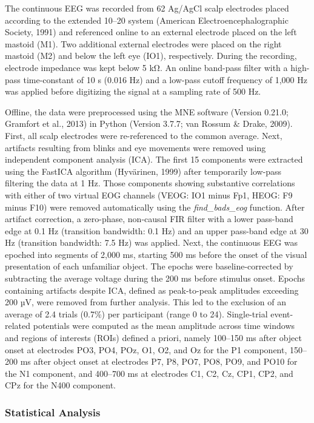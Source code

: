 \documentclass[
  english,
  man,11pt,floatsintext]{apa7}
\begin{document}
The continuous EEG was recorded from 62 Ag/AgCl scalp electrodes placed according to the extended 10--20 system (American Electroencephalographic Society, 1991) and referenced online to an external electrode placed on the left mastoid (M1). Two additional external electrodes were placed on the right mastoid (M2) and below the left eye (IO1), respectively. During the recording, electrode impedance was kept below 5 kΩ. An online band-pass filter with a high-pass time-constant of 10 s (0.016 Hz) and a low-pass cutoff frequency of 1,000 Hz was applied before digitizing the signal at a sampling rate of 500 Hz.

Offline, the data were preprocessed using the MNE software (Version 0.21.0; Gramfort et al., 2013) in Python (Version 3.7.7; van Rossum \& Drake, 2009). First, all scalp electrodes were re-referenced to the common average. Next, artifacts resulting from blinks and eye movements were removed using independent component analysis (ICA). The first 15 components were extracted using the FastICA algorithm (Hyvärinen, 1999) after temporarily low-pass filtering the data at 1 Hz. Those components showing substantive correlations with either of two virtual EOG channels (VEOG: IO1 minus Fp1, HEOG: F9 minus F10) were removed automatically using the \emph{find\_bads\_eog} function. After artifact correction, a zero-phase, non-causal FIR filter with a lower pass-band edge at 0.1 Hz (transition bandwidth: 0.1 Hz) and an upper pass-band edge at 30 Hz (transition bandwidth: 7.5 Hz) was applied. Next, the continuous EEG was epoched into segments of 2,000 ms, starting 500 ms before the onset of the visual presentation of each unfamiliar object. The epochs were baseline-corrected by subtracting the average voltage during the 200 ms before stimulus onset. Epochs containing artifacts despite ICA, defined as peak-to-peak amplitudes exceeding 200 µV, were removed from further analysis. This led to the exclusion of an average of 2.4 trials (0.7\%) per participant (range 0 to 24). Single-trial event-related potentials were computed as the mean amplitude across time windows and regions of interests (ROIs) defined a priori, namely 100--150 ms after object onset at electrodes PO3, PO4, POz, O1, O2, and Oz for the P1 component, 150--200 ms after object onset at electrodes P7, P8, PO7, PO8, PO9, and PO10 for the N1 component, and 400--700 ms at electrodes C1, C2, Cz, CP1, CP2, and CPz for the N400 component.

\hypertarget{statistical-analysis}{%
\subsubsection{Statistical Analysis}\label{statistical-analysis}}
\end{document}
